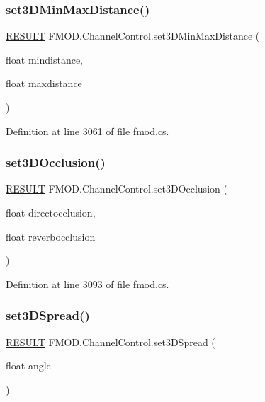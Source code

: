 \subsubsection{\texorpdfstring{set3\+D\+Min\+Max\+Distance()}{set3DMinMaxDistance()}}
{\footnotesize\ttfamily \hyperlink{namespace_f_m_o_d_a305d1176ef3f8c8815861a60407ac33d}{R\+E\+S\+U\+LT} F\+M\+O\+D.\+Channel\+Control.\+set3\+D\+Min\+Max\+Distance (\begin{DoxyParamCaption}\item[{float}]{mindistance,  }\item[{float}]{maxdistance }\end{DoxyParamCaption})}



Definition at line 3061 of file fmod.\+cs.

\mbox{\label{class_f_m_o_d_1_1_channel_control_a145c6282dcd74909a986ee9672b1c0ae}} 
\subsubsection{\texorpdfstring{set3\+D\+Occlusion()}{set3DOcclusion()}}
{\footnotesize\ttfamily \hyperlink{namespace_f_m_o_d_a305d1176ef3f8c8815861a60407ac33d}{R\+E\+S\+U\+LT} F\+M\+O\+D.\+Channel\+Control.\+set3\+D\+Occlusion (\begin{DoxyParamCaption}\item[{float}]{directocclusion,  }\item[{float}]{reverbocclusion }\end{DoxyParamCaption})}



Definition at line 3093 of file fmod.\+cs.

\mbox{\label{class_f_m_o_d_1_1_channel_control_a0749e7b796de77fba97491dc4c857e82}} 
\subsubsection{\texorpdfstring{set3\+D\+Spread()}{set3DSpread()}}
{\footnotesize\ttfamily \hyperlink{namespace_f_m_o_d_a305d1176ef3f8c8815861a60407ac33d}{R\+E\+S\+U\+LT} F\+M\+O\+D.\+Channel\+Control.\+set3\+D\+Spread (\begin{DoxyParamCaption}\item[{float}]{angle }\end{DoxyParamCaption})}



